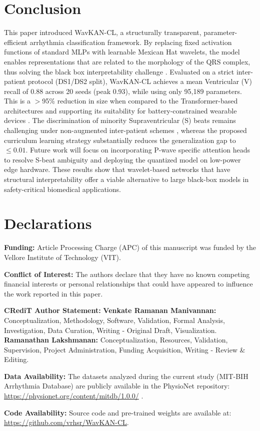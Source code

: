 \documentclass[final,5p,times,twocolumn,number]{elsarticle}
\begin{document}
\section{Conclusion}
\label{sec:conclusion}
This paper introduced WavKAN-CL, a structurally transparent, parameter-efficient arrhythmia classification framework. By replacing fixed activation functions of standard MLPs with learnable Mexican Hat wavelets, the model enables representations that are related to the morphology of the QRS complex, thus solving the black box interpretability challenge \cite{taleban_explainable_2026}. Evaluated on a strict inter-patient protocol (DS1/DS2 split), WavKAN-CL achieves a mean Ventricular (V) recall of 0.88 across 20 seeds (peak 0.93), while using only 95,189 parameters. This is a $>$95\% reduction in size when compared to the Transformer-based architectures and supporting its suitability for battery-constrained wearable devices \cite{farag_tiny_2023}. The discrimination of minority Supraventricular (S) beats remains challenging under non-augmented inter-patient schemes \cite{bahrami_investigation_2025}, whereas the proposed curriculum learning strategy substantially reduces the generalization gap to $\le 0.01$. Future work will focus on incorporating P-wave specific attention heads to resolve S-beat ambiguity and deploying the quantized model on low-power edge hardware. These results show that wavelet-based networks that have structural interpretability offer a viable alternative to large black-box models in safety-critical biomedical applications.


\section*{Declarations}

\textbf{Funding:} Article Processing Charge (APC) of this manuscript was funded by the Vellore Institute of Technology (VIT).

\textbf{Conflict of Interest:} The authors declare that they have no known competing financial interests or personal relationships that could have appeared to influence the work reported in this paper.

\textbf{CRediT Author Statement:} 
\textbf{Venkate Ramanan Manivannan:} Conceptualization, Methodology, Software, Validation, Formal Analysis, Investigation, Data Curation, Writing - Original Draft, Visualization. 
\textbf{Ramanathan Lakshmanan:} Conceptualization, Resources, Validation, Supervision, Project Administration, Funding Acquisition, Writing - Review \& Editing.

\textbf{Data Availability:} The datasets analyzed during the current study (MIT-BIH Arrhythmia Database) are publicly available in the PhysioNet repository: \url{https://physionet.org/content/mitdb/1.0.0/} \cite{moody_mit-bih_1992}.

\textbf{Code Availability:} Source code and pre-trained weights are available at: \url{https://github.com/vrhsr/WavKAN-CL}.



\end{document}
